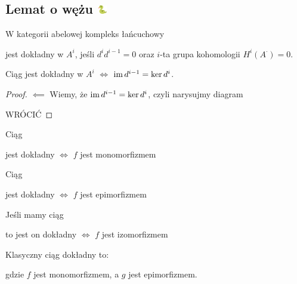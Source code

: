\subsection{Lemat o wężu \includegraphics[width=4mm]{wunsz.png}}

\begin{definition}
  W kategorii abelowej kompleks łańcuchowy
  \begin{center}\end{center}
  jest dokładny w $A^i$, jeśli $d^id^{i-1}=0$ oraz $i$-ta grupa kohomologii $H^i(A^\cdot)=0$.

\end{definition}

\begin{lemma}
  Ciąg jest dokładny w $A^i$ $\iff$ $\operatorname{im} d^{i-1}=\ker d^i$.
\end{lemma}

\begin{proof}
  $\impliedby$ 
  Wiemy, że $\operatorname{im} d^{i-1}=\ker d^i$, czyli narysujmy diagram
  \begin{center}\end{center}
  {\large\color{red}WRÓCIĆ}
\end{proof}

\begin{example}
  \item Ciąg  jest dokładny $\iff$ $f$ jest monomorfizmem 
  \item Ciąg  jest dokładny $\iff$ $f$ jest epimorfizmem 
  \item Jeśli mamy ciąg  to jest on dokładny $\iff$ $f$ jest izomorfizmem
  \item Klasyczny ciąg dokładny to:
    \begin{center}\end{center}
    gdzie $f$ jest monomorfizmem, a $g$ jest epimorfizmem.
\end{example}

